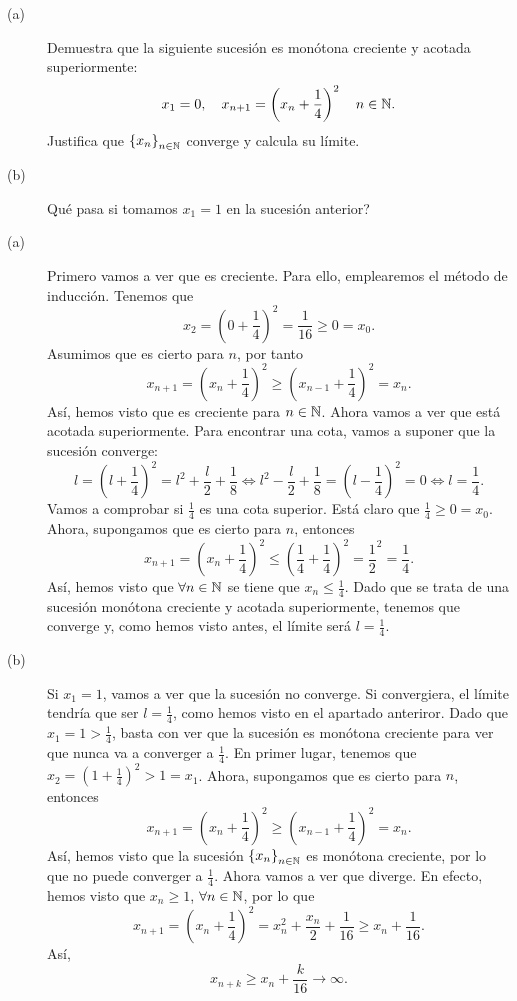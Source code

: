 \documentclass{article}
\begin{document}
\begin{ej}
\begin{description}
\item[(a)] Demuestra que la siguiente sucesión es monótona creciente y acotada superiormente:
	\[x_{1} = 0, \quad x_{n+1} = \left(x_{n}+\frac{1}{4}\right)^{2} \quad n \in \mathbb{N} .\]
	Justifica que $\displaystyle \left\{ x_{n}\right\} _{n\in\mathbb{N}} $ converge y calcula su límite.
\item[(b)] Qué pasa si tomamos $\displaystyle x_{1} = 1 $ en la sucesión anterior?
\end{description}
\end{ej}
\begin{sol}
\begin{description}
\item[(a)] Primero vamos a ver que es creciente. Para ello, emplearemos el método de inducción. Tenemos que 
	\[x_{2} = \left(0 + \frac{1}{4}\right)^{2} = \frac{1}{16} \geq 0 = x_{0} .\]
	Asumimos que es cierto para $\displaystyle n $, por tanto
	\[x_{n+1} = \left(x_{n}+\frac{1}{4}\right)^{2} \geq \left(x_{n-1}+\frac{1}{4}\right)^2 = x_{n}.\]
Así, hemos visto que es creciente para $\displaystyle n \in \mathbb{N} $. Ahora vamos a ver que está acotada superiormente. Para encontrar una cota, vamos a suponer que la sucesión converge:
\[l = \left(l + \frac{1}{4}\right)^{2} = l^{2}+\frac{l}{2}+\frac{1}{8} \iff l^{2}-\frac{l}{2}+\frac{1}{8} = \left(l - \frac{1}{4}\right)^2=0 \iff l = \frac{1}{4}.\]
Vamos a comprobar si $\displaystyle \frac{1}{4}$ es una cota superior. Está claro que $\displaystyle \frac{1}{4} \geq 0 = x_{0} $. Ahora, supongamos que es cierto para $\displaystyle n $, entonces
\[x_{n+1} = \left(x_{n}+\frac{1}{4}\right)^2 \leq \left(\frac{1}{4}+\frac{1}{4}\right)^{2} = \frac{1}{2}^{2} = \frac{1}{4} .\]
Así, hemos visto que $\displaystyle \forall n \in \mathbb{N} $ se tiene que $\displaystyle x_{n} \leq \frac{1}{4} $. Dado que se trata de una sucesión monótona creciente y acotada superiormente, tenemos que converge y, como hemos visto antes, el límite será $\displaystyle l = \frac{1}{4} $.
\item[(b)] Si $\displaystyle x_{1} = 1 $, vamos a ver que la sucesión no converge. Si convergiera, el límite tendría que ser $\displaystyle l = \frac{1}{4} $, como hemos visto en el apartado anteriror. Dado que $\displaystyle x_{1} = 1 > \frac{1}{4} $, basta con ver que la sucesión es monótona creciente para ver que nunca va a converger a $\displaystyle \frac{1}{4} $. En primer lugar, tenemos que $\displaystyle x_{2} = \left(1+\frac{1}{4}\right)^{2}>1=x_{1} $. 
	Ahora, supongamos que es cierto para $\displaystyle n $, entonces
	\[x_{n+1} = \left(x_{n}+\frac{1}{4}\right)^2 \geq \left(x_{n-1}+\frac{1}{4}\right)^{2} = x_{n} .\]
	Así, hemos visto que la sucesión $\displaystyle \left\{ x_{n}\right\} _{n\in\mathbb{N}} $ es monótona creciente, por lo que no puede converger a $\displaystyle \frac{1}{4} $. Ahora vamos a ver que diverge. En efecto, hemos visto que $\displaystyle x_{n} \geq 1 $, $\displaystyle \forall n \in \mathbb{N} $, por lo que
	\[x_{n+1} = \left(x_{n}+\frac{1}{4}\right)^2 = x_{n}^{2}+\frac{x_{n}}{2}+\frac{1}{16}\geq x_{n}+\frac{1}{16} .\]
	Así, 
	\[x_{n+k} \geq x_{n}+\frac{k}{16} \to \infty .\]
\end{description}
\end{sol}
\end{document}
